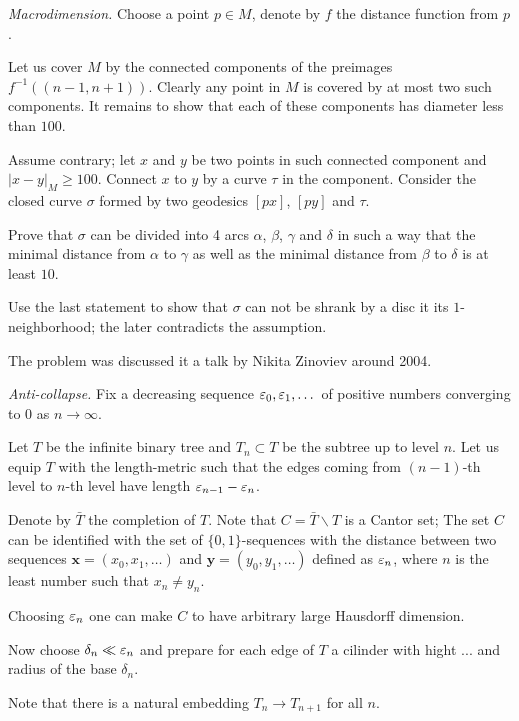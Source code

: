 \textit{Macrodimension.}
Choose a point $p\in M$,
denote by $f$ the distance function from $p$.

Let us cover $M$ by the connected components of the preimages 
$f^{-1}((n-1,n+1))$.
Clearly any point in $M$ is covered by at most two such components.
It remains to show that each of these components has diameter less than $100$.

Assume contrary; let $x$ and $y$ be two points in such connected component 
and $|x-y|_M\ge 100$.
Connect $x$ to $y$ by a curve $\tau$ in the component.
Consider the closed curve $\sigma$ formed by two geodesics $[px]$, $[py]$ and $\tau$.

Prove that $\sigma$ can be divided into 4 arcs $\alpha$, $\beta$, $\gamma$ and $\delta$
in such a way that the minimal distance from $\alpha$ to $\gamma$ as well as the minimal distance from $\beta$ to $\delta$ is at least $10$.

Use the last statement to show that $\sigma$ 
can not be shrank 
by a disc it its $1$-neighborhood;
the later contradicts the assumption.

The problem was discussed it a talk by Nikita Zinoviev around 2004.

\textit{Anti-collapse.}
Fix a decreasing sequence $\varepsilon_0,\varepsilon_1,\dots$ of positive numbers converging to $0$ as $n\to \infty$.

Let $T$ be the infinite binary tree
and $T_n\subset T$ be the subtree up to level $n$.
Let us equip $T$ with the length-metric such that the edges coming from $(n-1)$-th level to $n$-th level have length $\varepsilon_{n-1}-\varepsilon_n$.

Denote by $\bar T$ the completion of $T$.
Note that $C=\bar T\backslash T$ is a Cantor set;
The set $C$ can be identified with the set of $\{0,1\}$-sequences 
with the distance between two sequences $\bm{x}=(x_0,x_1,\dots)$ and $\bm{y}=(y_0,y_1,\dots)$ defined as $\varepsilon_n$, where $n$ is the least number such that $x_n\ne y_n$.

Choosing $\varepsilon_n$ one can make $C$ to have arbitrary large Hausdorff dimension.

Now choose $\delta_n\ll\varepsilon_n$ and prepare for each edge of $T$ a cilinder with hight ... and radius of the base $\delta_n$.
 

Note that there is a natural embedding $T_{n}\to T_{n+1}$ for all $n$.


